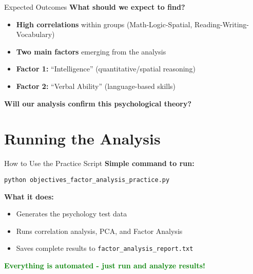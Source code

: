 \documentclass[aspectratio=169]{beamer}
\begin{document}
\begin{frame}{Expected Outcomes}
  \textbf{What should we expect to find?}
  
  \begin{itemize}
    \item \textbf{High correlations} within groups (Math-Logic-Spatial, Reading-Writing-Vocabulary)
    \pause
    \item \textbf{Two main factors} emerging from the analysis
    \pause
    \item \textbf{Factor 1:} ``Intelligence'' (quantitative/spatial reasoning)
    \pause
    \item \textbf{Factor 2:} ``Verbal Ability'' (language-based skills)
  \end{itemize}
  
  \pause
  
  \begin{center}
    \textbf{Will our analysis confirm this psychological theory?}
  \end{center}
\end{frame}

\section{Running the Analysis}

\begin{frame}{How to Use the Practice Script}
  \textbf{Simple command to run:}
  
  \begin{center}
    \Large \texttt{python objectives\_factor\_analysis\_practice.py}
  \end{center}
  
  \pause
  
  \textbf{What it does:}
  \begin{itemize}
    \item Generates the psychology test data
    \pause
    \item Runs correlation analysis, PCA, and Factor Analysis
    \pause
    \item Saves complete results to \texttt{factor\_analysis\_report.txt}
  \end{itemize}
  
  \pause
  
  \begin{center}
    \textcolor{green}{\textbf{Everything is automated - just run and analyze results!}}
  \end{center}
\end{frame}
\end{document}
